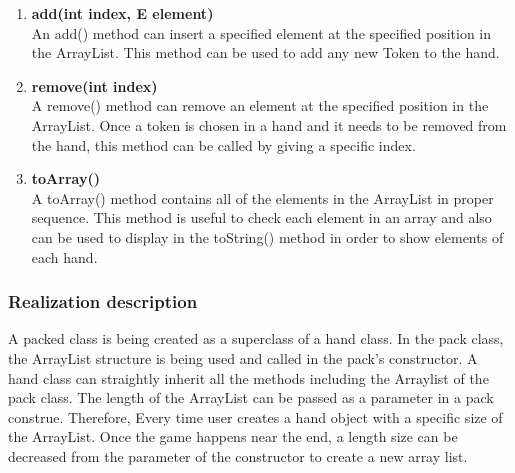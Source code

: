 \begin{enumerate}
	\item\textbf{add(int index, E element)}\\
An add() method can insert a specified element at the specified position in the ArrayList. This method can be used to add any new Token to the hand. 

	\item\textbf{remove(int index)}\\
A remove() method can remove an element at the specified position in the ArrayList. Once a token is chosen in a hand and it needs to be removed from the hand, this method can be called by giving a specific index.  
	
	\item\textbf{toArray()}\\
A toArray() method contains all of the elements in the ArrayList in proper sequence. This method is useful to check each element in an array and also can be used to display in the toString() method in order to show elements of each hand.  

\end{enumerate}

\subsubsection{Realization description}
A packed class is being created as a superclass of a hand class. In the pack class,  the ArrayList structure is being used and called in the pack's constructor. A hand class can straightly inherit all the methods including the Arraylist of the pack class. The length of the ArrayList can be passed as a parameter in a pack construe. Therefore, Every time user creates a hand object with a specific size of the ArrayList. Once the game happens near the end, a length size can be decreased from the parameter of the constructor to create a new array list.  
 
